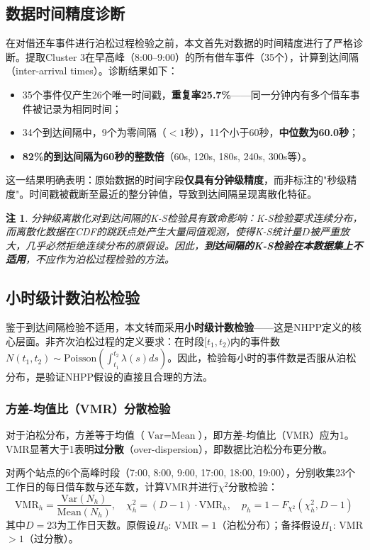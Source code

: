 \documentclass[12pt,a4paper]{article}
\newtheorem{remark}{注}
\begin{document}
\subsection{数据时间精度诊断}

在对借还车事件进行泊松过程检验之前，本文首先对数据的时间精度进行了严格诊断。提取Cluster 3在早高峰（8:00--9:00）的所有借车事件（35个），计算到达间隔（inter-arrival times）。诊断结果如下：
\begin{itemize}
    \item 35个事件仅产生26个唯一时间戳，\textbf{重复率25.7\%}——同一分钟内有多个借车事件被记录为相同时间；
    \item 34个到达间隔中，9个为零间隔（$< 1$秒），11个小于60秒，\textbf{中位数为60.0秒}；
    \item \textbf{82\%的到达间隔为60秒的整数倍}（60s, 120s, 180s, 240s, 300s等）。
\end{itemize}

这一结果明确表明：原始数据的时间字段\textbf{仅具有分钟级精度}，而非标注的"秒级精度"。时间戳被截断至最近的整分钟值，导致到达间隔呈现离散化特征。

\begin{remark}
分钟级离散化对到达间隔的K-S检验具有致命影响：K-S检验要求连续分布，而离散化数据在CDF的跳跃点处产生大量同值观测，使得K-S统计量$D$被严重放大，几乎必然拒绝连续分布的原假设。因此，\textbf{到达间隔的K-S检验在本数据集上不适用}，不应作为泊松过程检验的方法。
\end{remark}

\subsection{小时级计数泊松检验}

鉴于到达间隔检验不适用，本文转而采用\textbf{小时级计数检验}——这是NHPP定义的核心层面。非齐次泊松过程的定义要求：在时段$[t_1, t_2)$内的事件数$N(t_1, t_2) \sim \text{Poisson}(\int_{t_1}^{t_2} \lambda(s)ds)$。因此，检验每小时的事件数是否服从泊松分布，是验证NHPP假设的直接且合理的方法。

\subsubsection{方差-均值比（VMR）分散检验}

对于泊松分布，方差等于均值（$\text{Var} = \text{Mean}$），即方差-均值比（VMR）应为1。VMR显著大于1表明\textbf{过分散}（over-dispersion），即数据比泊松分布更分散。

对两个站点的6个高峰时段（7:00, 8:00, 9:00, 17:00, 18:00, 19:00），分别收集23个工作日的每日借车数与还车数，计算VMR并进行$\chi^2$分散检验：
\begin{equation}
\text{VMR}_h = \frac{\text{Var}(N_h)}{\text{Mean}(N_h)}, \quad \chi^2_h = (D-1) \cdot \text{VMR}_h, \quad p_h = 1 - F_{\chi^2}(\chi^2_h, D-1)
\end{equation}
其中$D=23$为工作日天数。原假设$H_0$: VMR$=1$（泊松分布）；备择假设$H_1$: VMR $> 1$（过分散）。
\end{document}
